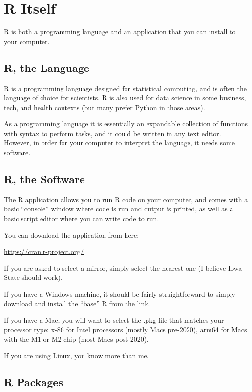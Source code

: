\documentclass[
  letterpaper,
  DIV=11,
  numbers=noendperiod]{scrreprt}
\begin{document}
\chapter{R Itself}\label{r-itself}

R is both a programming language and an application that you can install
to your computer.

\section{R, the Language}\label{r-the-language}

R is a programming language designed for statistical computing, and is
often the language of choice for scientists. R is also used for data
science in some business, tech, and health contexts (but many prefer
Python in those areas).

As a programming language it is essentially an expandable collection of
functions with syntax to perform tasks, and it could be written in any
text editor. However, in order for your computer to interpret the
language, it needs some software.

\section{R, the Software}\label{r-the-software}

The R application allows you to run R code on your computer, and comes
with a basic ``console'' window where code is run and output is printed,
as well as a basic script editor where you can write code to run.

You can download the application from here:

\url{https://cran.r-project.org/}

If you are asked to select a mirror, simply select the nearest one (I
believe Iowa State should work).

If you have a Windows machine, it should be fairly straightforward to
simply download and install the ``base'' R from the link.

If you have a Mac, you will want to select the .pkg file that matches
your processor type: x-86 for Intel processors (mostly Macs pre-2020),
arm64 for Macs with the M1 or M2 chip (most Macs post-2020).

If you are using Linux, you know more than me.

\section{R Packages}\label{r-packages}
\end{document}
